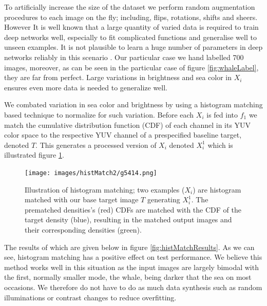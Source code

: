 \documentclass{IET}%
\begin{document}
To artificially increase the size of the dataset we perform random augmentation procedures to each image on the fly; including, flips, rotations, shifts and sheers. However It is well known that a large quantity of varied data is required to train deep networks well, especially to fit complicated functions and generalise well to unseen examples. It is not plausible to learn a huge number of parameters in deep networks reliably in this scenario \cite{zhu2011semi}. Our particular case we hand labelled 700 images, moreover, as can be seen in the particular case of figure \ref{fig:whaleLabel}, they are far from perfect. Large variations in brightness and sea color in $X_i$ ensures even more data is needed to generalize well. 

We combated variation in sea color and brightness by using a histogram matching \cite{gonzalez2002digital} based technique to normalize for such variation. Before each $X_i$ is fed into $f_1$ we match the cumulative distribution function (CDF) of each channel in its YUV color space to the respective YUV channel of a prespecified baseline target, denoted $T$. This generates a processed version of $X_i$ denoted $X_i^1$ which is illustrated figure \ref{fig:histMatch}.

\begin{figure}[h]
\centering
\texttt{[image: images/histMatch2/g5414.png]}
\caption{Illustration of histogram matching; two examples ($X_i$) are histogram matched with our base target image $T$ generating $X_i^1$. The prematched densities's (red) CDFs are matched with the CDF of the target density (blue), resulting in the matched output images and their corresponding densities (green).}
\label{fig:histMatch}
\end{figure}

The results of which are given below in figure \ref{fig:histMatchResults}. As we can see, histogram matching has a positive effect on test performance. We believe this method works well in this situation as the input images are largely bimodal with the first, normally smaller mode, the whale, being darker that the sea on most occasions. We therefore do not have to do as much data synthesis such as random illuminations or contrast changes to reduce overfitting.
\end{document}
